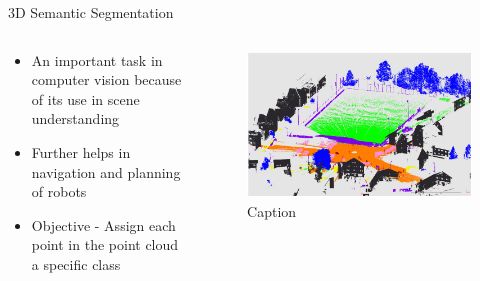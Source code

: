 \documentclass[aspectratio=169]{beamer}
\begin{document}
\begin{frame}{3D Semantic Segmentation}
    \begin{columns}
       \begin{column}{0.4\textwidth}
            \begin{itemize}
                \item An important task in computer vision because of its use in scene understanding
                \item Further helps in navigation and planning of robots
                \item Objective - Assign each point in the point cloud a specific class
            \end{itemize}       
       \end{column}
       \begin{column}{0.6\textwidth}
            \begin{figure}
                \centering
                \includegraphics[scale=0.3]{images/sample_LiDAR_PC_segmented.jpg}
                \caption{Caption}
                \label{fig:sample_lidar_pc_segmented}
            \end{figure}
       \end{column}
    \end{columns}
\end{frame}
\end{document}
